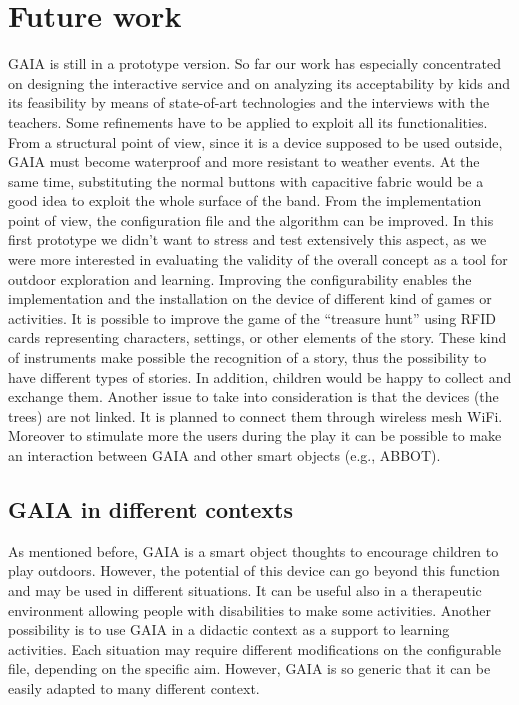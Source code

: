 \documentclass[a4paper,11pt]{report}
\begin{document}
\chapter{Future work}
GAIA is still in a prototype version. So far our work has especially concentrated on designing the interactive service and on analyzing its acceptability by kids and its feasibility by means of state-of-art technologies and the interviews with the teachers. Some refinements have to be applied to exploit all its functionalities. From a structural point of view, since it is a device supposed to be used outside, GAIA must become waterproof and more resistant to weather events. At the same time, substituting the normal buttons with capacitive fabric would be a good idea to exploit the whole surface of the band. From the implementation point of view, the configuration file and the algorithm can be improved. In this first prototype we didn’t want to stress and test extensively this aspect, as we were more interested in evaluating the validity of the overall concept as a tool for outdoor exploration and learning. Improving the configurability enables the implementation and the installation on the device of different kind of games or activities.
It is possible to improve the game of the “treasure hunt” using RFID cards representing characters, settings, or other elements of the story. These kind of instruments make possible the recognition of a story, thus the possibility to have different types of stories. In addition, children would be happy to collect and exchange them.
Another issue to take into consideration is that the devices (the trees) are not linked. It is planned to connect them through wireless mesh WiFi. 
Moreover to stimulate more the users during the play it can be possible to make an interaction between GAIA and other smart objects (e.g., ABBOT). 

\section{GAIA in different contexts}
As mentioned before, GAIA is a smart object thoughts to encourage children to play outdoors. However, the potential of this device can go beyond this function and may be used in different situations. It can be useful also in a therapeutic environment allowing people with disabilities to make some activities. Another possibility is to use GAIA in a didactic context as a support to learning activities.
Each situation may require different modifications on the configurable file, depending on the specific aim. However, GAIA is so generic that it can be easily adapted to many different context.
\end{document}
